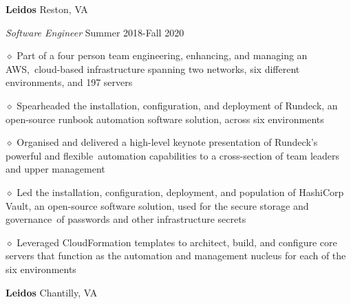 \documentclass[executivepaper]{extarticle}
\begin{document}
\begin{center}
{\begin{minipage}{7.0in}
\vspace{2mm}

{\noindent \textbf{\fontsize{12}{8}\selectfont Leidos}} {\hfill \fontsize{10}{8}\selectfont Reston, VA}

\vspace{0.5mm}

{\noindent \textit{\fontsize{12}{8}\selectfont Software Engineer}} {\hfill \fontsize{10}{8}\selectfont Summer 2018-Fall 2020}

\vspace{0.5mm}

{\noindent $\diamond$ {\fontsize{12}{8}\selectfont Part of a four person team engineering, enhancing, and managing an AWS, cloud-based infrastructure spanning two networks, six different environments, and 197 servers}}

\vspace{1mm}

{\noindent $\diamond$ {\fontsize{12}{8}\selectfont Spearheaded the installation, configuration, and deployment of Rundeck, an open-source runbook automation software solution, across six environments}}

\vspace{1mm}

{\noindent $\diamond$ {\fontsize{12}{8}\selectfont Organised and delivered a high-level keynote presentation of Rundeck's powerful and flexible automation capabilities to a cross-section of team leaders and upper management}}

\vspace{1mm}

{\noindent $\diamond$ {\fontsize{12}{8}\selectfont Led the installation, configuration, deployment, and population of HashiCorp Vault, an open-source software solution, used for the secure storage and governance of passwords and other infrastructure secrets}}

\vspace{1mm}

{\noindent $\diamond$ {\fontsize{12}{8}\selectfont Leveraged CloudFormation templates to architect, build, and configure core servers that function as the automation and management nucleus for each of the six environments}}

\vspace{2mm}

{\noindent \textbf{\fontsize{12}{8}\selectfont Leidos}} {\hfill \fontsize{10}{8}\selectfont Chantilly, VA}

\vspace{0.25mm}


\end{minipage}}
\end{center}
\end{document}
